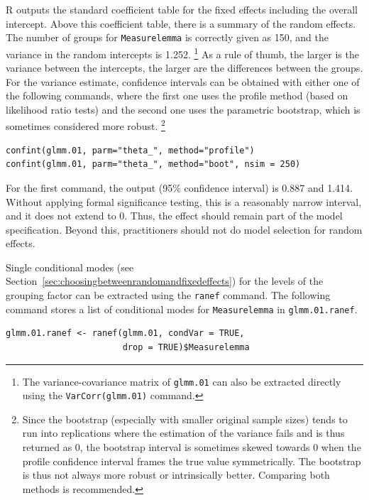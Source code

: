 R outputs the standard coefficient table for the fixed effects including the overall intercept.
Above this coefficient table, there is a summary of the random effects.
The number of groups for \texttt{Measurelemma} is correctly given as 150, and the variance in the random intercepts is 1.252.%
\footnote{The variance-covariance matrix of \texttt{glmm.01} can also be extracted directly using the \texttt{VarCorr(glmm.01)} command.}
As a rule of thumb, the larger is the variance between the intercepts, the larger are the differences between the groups.
For the variance estimate, confidence intervals can be obtained with either one of the following commands, where the first one uses the profile method (based on likelihood ratio tests) and the second one uses the parametric bootstrap, which is sometimes considered more robust.%
\footnote{Since the bootstrap (especially with smaller original sample sizes) tends to run into replications where the estimation of the variance fails and is thus returned as 0, the bootstrap interval is sometimes skewed towards 0 when the profile confidence interval frames the true value symmetrically. The bootstrap is thus not always more robust or intrinsically better.
Comparing both methods is recommended.}

\vspace{0.5\baselineskip}

\begin{lstlisting}
confint(glmm.01, parm="theta_", method="profile")
confint(glmm.01, parm="theta_", method="boot", nsim = 250)
\end{lstlisting}

For the first command, the output (95\% confidence interval) is 0.887 and 1.414.
Without applying formal significance testing, this is a reasonably narrow interval, and it does not extend to 0.
Thus, the effect should remain part of the model specification.
Beyond this, practitioners should not do model selection for random effects.

Single conditional modes (see Section~\ref{sec:choosingbetweenrandomandfixedeffects}) for the levels of the grouping factor can be extracted using the \texttt{ranef} command.
The following command stores a list of conditional modes for \texttt{Measurelemma} in \texttt{glmm.01.ranef}.

\vspace{0.5\baselineskip}

\begin{lstlisting}
glmm.01.ranef <- ranef(glmm.01, condVar = TRUE,
                       drop = TRUE)$Measurelemma
\end{lstlisting}

